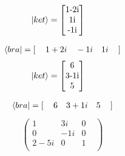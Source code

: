 \documentclass[10pt,a4paper]{article}
\begin{document}
\begin{align}
\ket{ket}&=\begin{bmatrix}
$1-2i$\\
$1i$\\
$-1i$\\
\end{bmatrix}
\end{align}

\begin{align}
\bra{bra}=[\,\quad1+2i\quad-1i\quad1i\quad\,]
\end{align}
\begin{align}
\ket{ket}&=\begin{bmatrix}
$6$\\
$3-1i$\\
$5$\\
\end{bmatrix}
\end{align}

\begin{align}
\bra{bra}=[\,\quad6\quad3+1i\quad5\quad\,]
\end{align}
\begin{align}
\begin{pmatrix}
1&3i &0&\\0&-1i &0&\\2-5i &0&1&\\\end{pmatrix}
\end{align}
\end{document}
